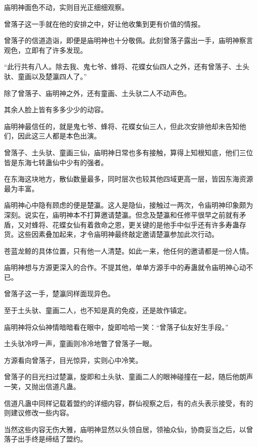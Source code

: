 
\begin{this_body}



庙明神面色不动，实则目光正细细观察。

曾落子这一手就在他的安排之中，好让他收集到更有价值的情报。

曾落子的信道造诣，即便是庙明神也十分敬佩。此刻曾落子露出一手，庙明神察言观色，立即有了许多发现。

“此行共有八人。除去我、鬼七爷、蜂将、花蝶女仙四人之外，还有曾落子、土头驮、童画以及楚瀛四人了。”

除了曾落子、庙明神之外，还有童画、土头驮二人不动声色。

其余人脸上皆有多多少少的动容。

庙明神最信任的，就是鬼七爷、蜂将、花蝶女仙三人，但此次安排他却未告知他们，因此这三人都是本色出演。

曾落子、土头驮、童画三仙，庙明神日常也多有接触，算得上知根知底，他们三位皆是东海七转蛊仙中少有的强者。

在东海这块地方，散仙数量最多，同时层次也较其他四域更高一层，皆因东海资源最为丰富。

庙明神心中隐有顾虑的便是楚瀛。这人是隐仙，接触过一两次，令庙明神印象颇为深刻。说实在，庙明神本不打算邀请楚瀛。但念及楚瀛和任修平很早之前就有矛盾，又对蜂将、花蝶女仙有着救命之恩，更关键的是他手中似乎还有许多寿蛊存货。这些因素叠加起来，才令庙明神最终敲定邀请楚瀛参加此次行动。

苍蓝龙鲸的具体位置，只有他一人清楚。如此一来，他任何的邀请都是一份人情。

庙明神想与方源更深入的合作。不提其他，单单方源手中的寿蛊就令庙明神心动不已。

曾落子这一手，楚瀛同样面现异色。

至于土头驮、童画二人，也不知是真的免疫，还是故作镇定。

庙明神将众仙神情暗暗看在眼中，旋即哈哈一笑：“曾落子仙友好生手段。”

土头驮冷哼一声，童画则冷冷地瞥了曾落子一眼。

方源看向曾落子，目光惊异，实则心中冷笑。

曾落子的目光扫过楚瀛，旋即和土头驮、童画二人的眼神碰撞在一起，随后他朗声一笑，又抛出信道凡蛊。

信道凡蛊中同样记载着盟约的详细内容，群仙视察之后，有的点头表示接受，有的则建议修改一些内容。

当然这些内容无伤大雅，庙明神显然以头领自居，领袖众仙，协商妥当之后，以曾落子出手终是缔结了盟约。


\end{this_body}
